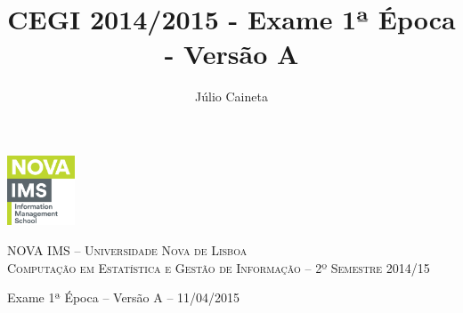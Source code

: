 \documentclass[addpoints]{exam}
\author{Júlio Caineta}
\title{CEGI 2014/2015 - Exame 1ª Época - Versão A}
\begin{document}
	
\noindent\begin{minipage}{0.2\textwidth}%
	\includegraphics[width=2cm]{logo.png}
\end{minipage}
\hfill
\begin{minipage}{0.8\textwidth}
	\begin{center}
		\textsc {\small NOVA IMS -- Universidade Nova de Lisboa} \\
		\textsc {Computação em Estatística e Gestão de Informação -- 2º Semestre 2014/15}
	\end{center}
\end{minipage}


\begin{center}
	{\large Exame 1ª Época -- Versão A -- 11/04/2015}
\end{center}
 
\vspace{5mm}
\vspace{5mm}
\end{document}
